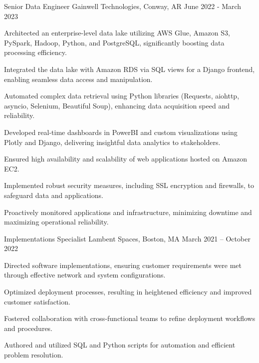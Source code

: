 \begin{cventries}
\cventry
{Senior Data Engineer} %
{Gainwell Technologies, Conway, AR} %
{} %
{June 2022 - March 2023} %
{ %
\begin{cvitems}
\item {Architected an enterprise-level data lake utilizing AWS Glue, Amazon S3, PySpark, Hadoop, Python, and PostgreSQL, significantly boosting data processing efficiency.}
\item {Integrated the data lake with Amazon RDS via SQL views for a Django frontend, enabling seamless data access and manipulation.}
\item {Automated complex data retrieval using Python libraries (Requests, aiohttp, asyncio, Selenium, Beautiful Soup), enhancing data acquisition speed and reliability.}
\item {Developed real-time dashboards in PowerBI and custom visualizations using Plotly and Django, delivering insightful data analytics to stakeholders.}
\item {Ensured high availability and scalability of web applications hosted on Amazon EC2.}
\item {Implemented robust security measures, including SSL encryption and firewalls, to safeguard data and applications.}
\item {Proactively monitored applications and infrastructure, minimizing downtime and maximizing operational reliability.}
\end{cvitems}
}


\cventry
{Implementations Specialist} %
{Lambent Spaces, Boston, MA} %
{} %
{March 2021 – October 2022} %
{ %
\begin{cvitems}
\item {Directed software implementations, ensuring customer requirements were met through effective network and system configurations.}
\item {Optimized deployment processes, resulting in heightened efficiency and improved customer satisfaction.}
\item {Fostered collaboration with cross-functional teams to refine deployment workflows and procedures.}
\item {Authored and utilized SQL and Python scripts for automation and efficient problem resolution.}
\end{cvitems}
}


\end{cventries}
